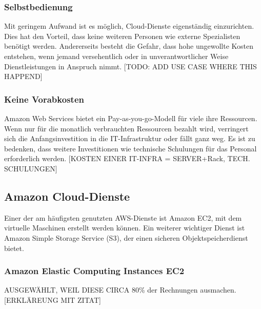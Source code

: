 \subsubsection{Selbstbedienung}
Mit geringem Aufwand ist es möglich, Cloud-Dienste eigenständig einzurichten. Dies hat den Vorteil, dass keine weiteren Personen wie externe Spezialisten benötigt werden.
Andererseits besteht die Gefahr, dass hohe ungewollte Kosten entstehen, wenn jemand versehentlich oder in unverantwortlicher Weise Dienstleistungen in Anspruch nimmt.
      [TODO: ADD USE CASE WHERE THIS HAPPEND]

\subsubsection{Keine Vorabkosten}
Amazon Web Services bietet ein Pay-as-you-go-Modell für viele ihre Ressourcen. %
Wenn nur für die monatlich verbrauchten Ressourcen bezahlt wird, verringert sich die Anfangsinvestition in die IT-Infrastruktur oder fällt ganz weg. Es ist zu bedenken, dass weitere Investitionen wie technische Schulungen für das Personal erforderlich werden. [KOSTEN EINER IT-INFRA = SERVER+Rack, TECH. SCHULUNGEN]

\subsection{Amazon Cloud-Dienste}
Einer der am häufigsten genutzten AWS-Dienste ist Amazon EC2, mit dem virtuelle Maschinen erstellt werden können{\cite{STA4}}.
Ein weiterer wichtiger Dienst ist Amazon Simple Storage Service (S3), der einen sicheren Objektspeicherdienst bietet.\subsubsection{Amazon Elastic Computing Instances EC2 }
AUSGEWÄHLT, WEIL DIESE CIRCA 80\% der Rechnungen ausmachen.[ERKLÄREUNG MIT ZITAT]
